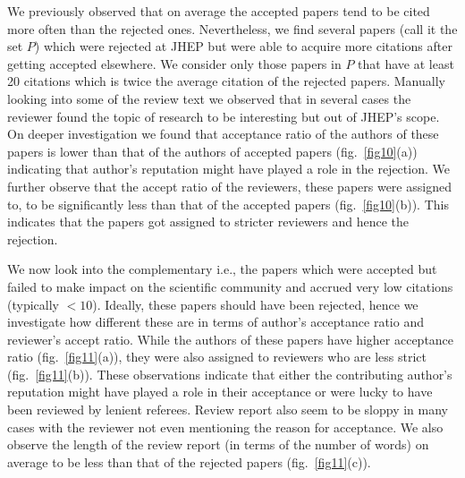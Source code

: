  We previously observed that on average the accepted papers tend to be cited more often than the rejected ones. Nevertheless, we find several papers (call it the set $P$) which were rejected at JHEP but were able to acquire more citations after getting accepted elsewhere. We consider only those papers in $P$ that have at least 20 citations which is twice the average citation of the rejected papers.
Manually looking into some of the review text we observed that in several cases the reviewer found the topic of research to be interesting but out of JHEP's scope. On deeper investigation we found that acceptance ratio of the authors of these papers is lower than that of the authors of accepted papers (fig.~\ref{fig10}(a)) indicating that author's reputation might have played a role in the rejection. We further observe that the accept ratio of the reviewers, these papers were assigned to, to be significantly less than that of the accepted papers (fig.~\ref{fig10}(b)). This indicates that the papers got assigned to stricter reviewers and hence the rejection.

 We now look into the complementary i.e., the papers which were accepted but failed to make impact on the scientific community and accrued very low citations (typically $< 10$). Ideally, these papers should have been rejected, hence we investigate how different these are in terms of author's acceptance ratio and reviewer's accept ratio. While the authors of these papers have higher acceptance ratio (fig.~\ref{fig11}(a)), they were also assigned to reviewers who are less strict (fig.~\ref{fig11}(b)). These observations indicate that either the contributing author's reputation might have played a role in their acceptance or were lucky to have been reviewed by lenient referees. Review report also seem to be sloppy in many cases with the reviewer not even mentioning the reason for acceptance. We also observe the length of the review report (in terms of the number of words) on average to be less than that of the rejected papers (fig.~\ref{fig11}(c)). 


%

